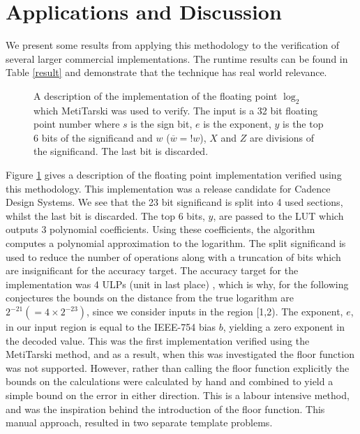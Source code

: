 \documentclass{fac}
\begin{document}
\section{Applications and Discussion}
\label{Apps}
We present some results from applying this methodology to the verification of several larger commercial implementations. The runtime results can be found in Table \ref{result} and demonstrate that the technique has real world relevance.

\begin{figure}
\centering

\caption{A description of the implementation of the floating point $\log_2$ which MetiTarski was used to verify. The input is a 32 bit floating point number where $s$ is the sign bit, $e$ is the exponent, $y$ is the top 6 bits of the significand and $w$ ($\overline{w} = !w$), $X$ and $Z$ are divisions of the significand. The last bit is discarded.\label{block_diagram}}
\end{figure}

Figure \ref{block_diagram} gives a description of the floating point implementation verified using this methodology. This implementation was a release candidate for Cadence Design Systems. We see that the 23 bit significand is split into 4 used sections, whilst the last bit is discarded. The top 6 bits, $y$, are passed to the LUT which outputs 3 polynomial coefficients. Using these coefficients, the algorithm computes a polynomial approximation to the logarithm. The split significand is used to reduce the number of operations along with a truncation of bits which are insignificant for the accuracy target. The accuracy target for the implementation was 4 ULPs (unit in last place) \cite{muller2010handbook}, which is why, for the following conjectures the bounds on the distance from the true logarithm are $2^{-21}(=4\times 2^{-23})$, since we consider inputs in the region [1,2). The exponent, $e$, in our input region is equal to the IEEE-754 bias $b$, yielding a zero exponent in the decoded value. This was the first implementation verified using the MetiTarski method, and as a result, when this was investigated the floor function was not supported. However, rather than calling the floor function explicitly the bounds on the calculations were calculated by hand and combined to yield a simple bound on the error in either direction. This is a labour intensive method, and was the inspiration behind the introduction of the floor function. This manual approach, resulted in two separate template problems. 
\end{document}
